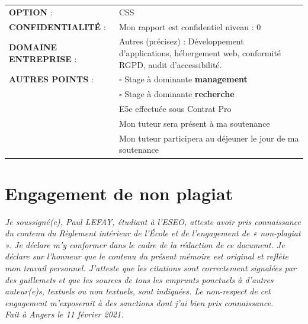 \documentclass[12pt]{article}
\begin{document}
\begin{center}
	\begin{tabular}{ m{5cm} m{11.5cm} }
	\textbf{OPTION} : &  \mbox{\ooalign{$\checkmark$\cr\hidewidth$\square$\hidewidth\cr}} CSS  \\
    \textbf{CONFIDENTIALITÉ} :  & Mon rapport est confidentiel niveau : \mbox{\ooalign{$\checkmark$\cr\hidewidth$\square$\hidewidth\cr}} 0 \\
    \textbf{DOMAINE ENTREPRISE} : & \mbox{\ooalign{$\checkmark$\cr\hidewidth$\square$\hidewidth\cr}} Autres (précisez) : Développement d'applications, hébergement web, conformité RGPD, audit d'accessibilité. \\
    \textbf{AUTRES POINTS} : &  $\square$ Stage à dominante \textbf{management} \\
                             &  $\square$ Stage à dominante \textbf{recherche} \\
                             & \mbox{\ooalign{$\checkmark$\cr\hidewidth$\square$\hidewidth\cr}} E5e effectuée sous Contrat Pro \\
                             &  \mbox{\ooalign{$\checkmark$\cr\hidewidth$\square$\hidewidth\cr}} Mon tuteur sera présent à ma soutenance \\
                             &  \mbox{\ooalign{$\checkmark$\cr\hidewidth$\square$\hidewidth\cr}} Mon tuteur participera au déjeuner le jour de ma soutenance \\
\end{tabular}
\end{center}

\newpage
\section{Engagement de non plagiat}
\textit{Je soussigné(e), Paul LEFAY, étudiant à l'\gls{ESEO}, atteste avoir pris connaissance du contenu du Règlement intérieur de l'École et de l'engagement de « non-plagiat ». 
Je déclare m'y conformer dans le cadre de la rédaction de ce document. 
Je déclare sur l'honneur que le contenu du présent mémoire est original et reflète mon travail personnel. 
J'atteste que les citations sont correctement signalées par des guillemets et que les sources de tous les emprunts ponctuels à d'autres auteur(e)s, textuels ou non textuels, sont indiquées. 
Le non-respect de cet engagement m'exposerait à des sanctions dont j'ai bien pris connaissance.} \\

\textit{Fait à Angers le 11 février 2021.}
\end{document}
